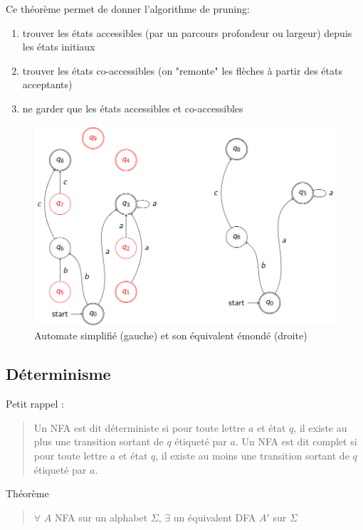 \documentclass{article}
\begin{document}
Ce théorème permet de donner l'algorithme de pruning:
\begin{enumerate}
    \item trouver les états accessibles (par un parcours profondeur ou largeur) depuis les états initiaux
    \item trouver les états co-accessibles (on "remonte" les flèches à partir des états acceptants)
    \item ne garder que les états accessibles et co-accessibles
\end{enumerate}
\begin{figure}[h]
    \centering
    \includegraphics[scale=0.3]{simp_pruned_aut.png}
    \caption{Automate simplifié (gauche) et son équivalent émondé (droite)}
\end{figure}
\newpage
\subsection{Déterminisme}
Petit rappel :
\begin{quote}
    Un NFA est dit déterministe si pour toute lettre $a$ et état $q$, il existe au plus une transition sortant de $q$ étiqueté par $a$.\newline
    Un NFA est dit complet si pour toute lettre $a$ et état $q$, il existe au moins une transition sortant de $q$ étiqueté par $a$.\newline
\end{quote}

Théorème
\begin{quote}
    $\forall$ $A$ NFA sur un alphabet $\Sigma$, $\exists$ un équivalent DFA $A'$ sur $\Sigma$ 
\end{quote}
\end{document}
